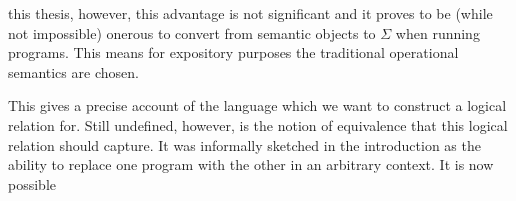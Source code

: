 this thesis, however, this advantage is not significant and it proves
to be (while not impossible) onerous to convert from semantic objects
to $\Sigma$ when running programs. This means for expository purposes
the traditional operational semantics are chosen.
This gives a precise account of the language which we want to
construct a logical relation for. Still undefined, however, is the
notion of equivalence that this logical relation should capture. It
was informally sketched in the introduction as the ability to replace
one program with the other in an arbitrary context. It is now possible
